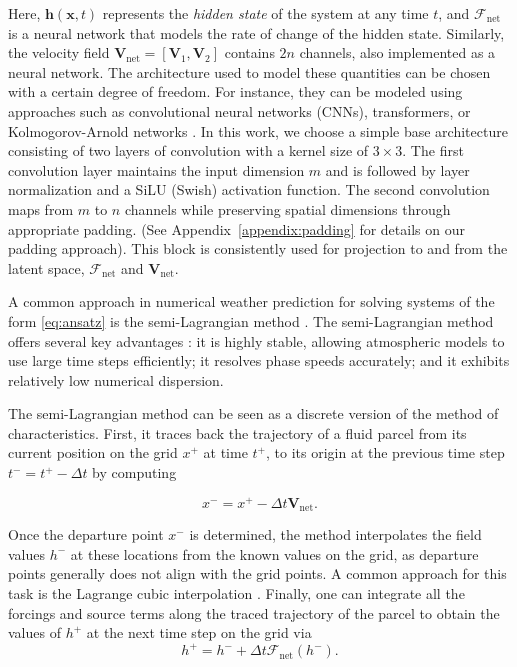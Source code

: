 \documentclass[preprint]{article}
\begin{document}
Here, $\mathbf{h}(\mathbf{x}, t)$ represents the \textit{hidden state} of the system at any time $t$, and $\mathcal{F}_\text{net}$ is a neural network that models the rate of change of the hidden state. Similarly, the velocity field $\mathbf{V}_\text{net}=[\mathbf{V}_1,\mathbf{V}_2]$ contains $2n$ channels, also implemented as a neural network. The architecture used to model these quantities can be chosen with a certain degree of freedom. For instance, they can be modeled using approaches such as convolutional neural networks (CNNs), transformers, or Kolmogorov-Arnold networks \cite{liu2024kan}. In this work, we choose a simple base architecture consisting of two layers of convolution with a kernel size of $3\times3$. The first convolution layer maintains the input dimension $m$ and is followed by layer normalization and a SiLU (Swish) activation function. The second convolution maps from $m$ to $n$ channels while preserving spatial dimensions through appropriate padding. (See Appendix~\ref{appendix:padding} for details on our padding approach). This block is consistently used for projection to and from the latent space, $\mathcal{F}_\text{net}$ and $\mathbf{V}_\text{net}$.


A common approach in numerical weather prediction for solving systems of the form \eqref{eq:ansatz} is the semi-Lagrangian method \cite{robert1981stable}. The semi-Lagrangian method offers several key advantages \cite{fletcher2019semi}: it is highly stable, allowing atmospheric models to use large time steps efficiently; it resolves phase speeds accurately; and it exhibits relatively low numerical dispersion.

The semi-Lagrangian method can be seen as a discrete version of the method of characteristics. First, it traces back the trajectory of a fluid parcel from its current position on the grid $x^+$ at time $t^+$, to its origin at the previous time step $t^- = t^+ - \Delta t$ by computing

\begin{equation}\label{eq:traj}
x^- = x^+ - \Delta t \mathbf{V}_\text{net} .  
\end{equation}\label{eq:SL}

Once the departure point $x^-$ is determined, the method interpolates the field values $h^-$ at these locations from the known values on the grid, as departure points generally does not align with the grid points. A common approach for this task is the Lagrange cubic interpolation \cite{mcdonald1984accuracy}. Finally, one can integrate all the forcings and source terms along the traced trajectory of the parcel to obtain the values of $h^+$ at the next time step on the grid via
\begin{equation}\label{eq:SL}
h^+ = h^- + \Delta t \mathcal{F}_\text{net}(h^-).    
\end{equation}
\end{document}
